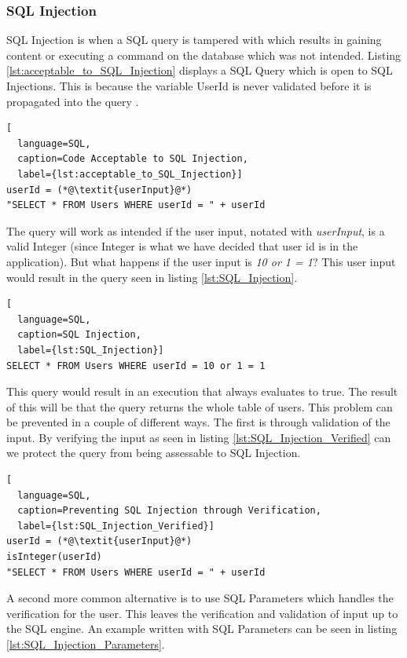 \subsubsection{SQL Injection}
SQL Injection is when a SQL query is tampered with which results in gaining content or executing a command on the database which was not intended. Listing \ref{lst:acceptable_to_SQL_Injection} displays a SQL Query which is open to SQL Injections. This is because the variable UserId is never validated before it is propagated into the query \parencite{JustinClarke-Salt2009SIAa, Secure_Web}.

\hfill
\begin{lstlisting}[
  language=SQL,
  caption=Code Acceptable to SQL Injection,
  label={lst:acceptable_to_SQL_Injection}]
userId = (*@\textit{userInput}@*)
"SELECT * FROM Users WHERE userId = " + userId
\end{lstlisting}
\hfill

The query will work as intended if the user input, notated with \textit{userInput}, is a valid Integer (since Integer is what we have decided that user id is in the application). But what happens if the user input is \textit{10 or 1 = 1}? This user input would result in the query seen in listing \ref{lst:SQL_Injection}.

\hfill
\begin{lstlisting}[
  language=SQL,
  caption=SQL Injection,
  label={lst:SQL_Injection}]
SELECT * FROM Users WHERE userId = 10 or 1 = 1
\end{lstlisting}
\hfill

This query would result in an execution that always evaluates to true. The result of this will be that the query returns the whole table of users. This problem can be prevented in a couple of different ways. The first is through validation of the input. By verifying the input as seen in listing \ref{lst:SQL_Injection_Verified} can we protect the query from being assessable to SQL Injection.

\hfill
\begin{lstlisting}[
  language=SQL,
  caption=Preventing SQL Injection through Verification,
  label={lst:SQL_Injection_Verified}]
userId = (*@\textit{userInput}@*)
isInteger(userId)
"SELECT * FROM Users WHERE userId = " + userId
\end{lstlisting}
\hfill

A second more common alternative is to use SQL Parameters which handles the verification for the user. This leaves the verification and validation of input up to the SQL engine. An example written with SQL Parameters can be seen in listing \ref{lst:SQL_Injection_Parameters}.

